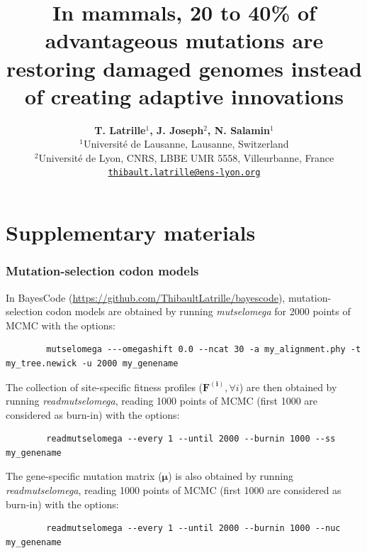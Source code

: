 \documentclass{article}
\title{In mammals, 20 to 40\% of advantageous mutations are restoring damaged genomes instead of creating adaptive innovations}
\author{
    \large
    \textbf{T. {Latrille}$^{1}$, J. {Joseph}$^{2}$, N. {Salamin}$^{1}$}\\
    \normalsize $^{1}$Université de Lausanne, Lausanne, Switzerland\\
    \normalsize $^{2}$Université de Lyon, CNRS, LBBE UMR 5558, Villeurbanne, France \\
    \normalsize \texttt{\href{mailto:thibault.latrille@ens-lyon.org}{thibault.latrille@ens-lyon.org}} \\
}
\date{}
\newcommand{\UniDimArray}[1]{\bm{#1}}
\begin{document}
    \maketitle
    \part*{Supplementary materials}
    \tableofcontents
    \clearpage


    \section{Mutation-selection codon models}\label{sec:site-specific-mutation-selection-codon-models}
    In BayesCode (\url{https://github.com/ThibaultLatrille/bayescode}), mutation-selection codon models are obtained by running \textit{mutselomega} for 2000 points of MCMC with the options:
    \begin{scriptsize}
        \begin{verbatim}
        mutselomega ---omegashift 0.0 --ncat 30 -a my_alignment.phy -t my_tree.newick -u 2000 my_genename
        \end{verbatim}
    \end{scriptsize}
    The collection of site-specific fitness profiles ($\UniDimArray{F^{(i)}}, \forall i$) are then obtained by running \textit{readmutselomega}, reading 1000 points of MCMC (first 1000 are considered as burn-in) with the options:
    \begin{scriptsize}
        \begin{verbatim}
        readmutselomega --every 1 --until 2000 --burnin 1000 --ss my_genename
        \end{verbatim}
    \end{scriptsize}
    The gene-specific mutation matrix ($\UniDimArray{\mu}$) is also obtained by running \textit{readmutselomega}, reading 1000 points of MCMC (first 1000 are considered as burn-in) with the options:
    \begin{scriptsize}
        \begin{verbatim}
        readmutselomega --every 1 --until 2000 --burnin 1000 --nuc my_genename
        \end{verbatim}
    \end{scriptsize}
\end{document}
